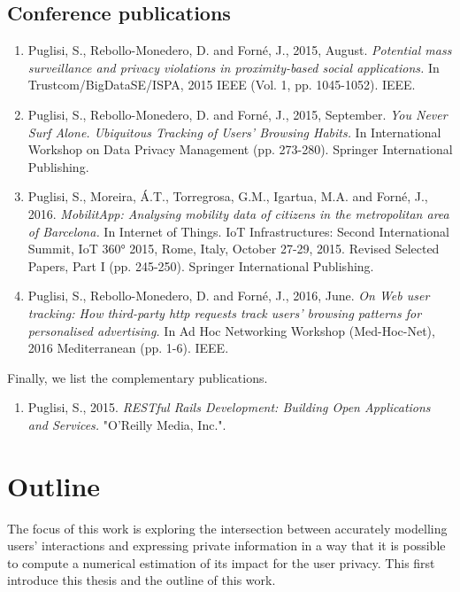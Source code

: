 \subsection{Conference publications}
\begin{enumerate}

    \item Puglisi, S., Rebollo-Monedero, D. and Forn\'e, J., 2015, August. \emph{Potential mass surveillance and privacy violations in proximity-based social applications.} In Trustcom/BigDataSE/ISPA, 2015 IEEE (Vol. 1, pp. 1045-1052). IEEE.
    
    \item Puglisi, S., Rebollo-Monedero, D. and Forn\'e, J., 2015, September. \emph{You Never Surf Alone. Ubiquitous Tracking of Users’ Browsing Habits.} In International Workshop on Data Privacy Management (pp. 273-280). Springer International Publishing.
    
    \item Puglisi, S., Moreira, \'A.T., Torregrosa, G.M., Igartua, M.A. and Forn\'e, J., 2016. \emph{MobilitApp: Analysing mobility data of citizens in the metropolitan area of Barcelona.} In Internet of Things. IoT Infrastructures: Second International Summit, IoT 360° 2015, Rome, Italy, October 27-29, 2015. Revised Selected Papers, Part I (pp. 245-250). Springer International Publishing.
    
    \item Puglisi, S., Rebollo-Monedero, D. and Forn\'e, J., 2016, June. \emph{On Web user tracking: How third-party http requests track users' browsing patterns for personalised advertising.} In Ad Hoc Networking Workshop (Med-Hoc-Net), 2016 Mediterranean (pp. 1-6). IEEE. 

\end{enumerate}

Finally, we list the complementary publications.

\begin{enumerate}
    \item Puglisi, S., 2015. \emph{RESTful Rails Development: Building Open Applications and Services.} "O'Reilly Media, Inc.".
\end{enumerate}

\section{Outline}

The focus of this work is exploring the intersection between accurately modelling users' interactions and expressing private information in a way that it is possible to compute a numerical estimation of its impact for the user privacy. This first introduce this thesis and the outline of this work.

